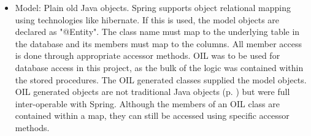 \documentclass[a4paper, 11pt, titlepage]{article}
\begin{document}
\begin{itemize} 
\item Model: Plain old Java objects. Spring supports object relational mapping using technologies like hibernate. If this is used, the model objects are declared as "@Entity". The class name must map to the underlying table in the database and its members must map to the columns. All member access is done through appropriate accessor methods. 
OIL was to be used for database access in this project, as the bulk of the logic was contained within the stored procedures. The OIL generated classes supplied the model objects. OIL generated objects are not traditional Java objects (p. \pageref{metadata}) but were full inter-operable with Spring. Although the members of an OIL class are contained within a map, they can still be accessed using specific accessor methods. 


\end{itemize}
\end{document}
